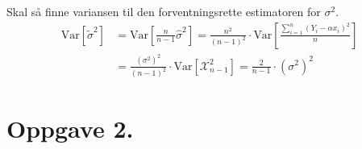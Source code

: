 \documentclass[a4paper,11pt,norsk]{article}
\begin{document}
\begin{enumerate}
        Skal så finne variansen til den forventningsrette estimatoren for $\sigma^2$.
        \begin{align*}
            \text{Var}[\tilde{\sigma}^2] &= \text{Var}\left[\frac{n}{n-1} \hat{\sigma}^2\right] = \frac{n^2}{(n-1)^2} \cdot \text{Var}\left[\frac{\sum_{i=1}^{n}{(Y_i - \alpha x_i)^2}}{n}\right] \\ 
                                         &= \frac{\left(\sigma^2\right)^2}{(n-1)^2} \cdot \text{Var}\left[\mathcal{X}_{n-1}^2\right] = \boxed{\frac{2}{n-1} \cdot \left(\sigma^2\right)^2}
        \end{align*}
\end{enumerate}

\newpage
\section*{Oppgave 2.}
\end{document}
